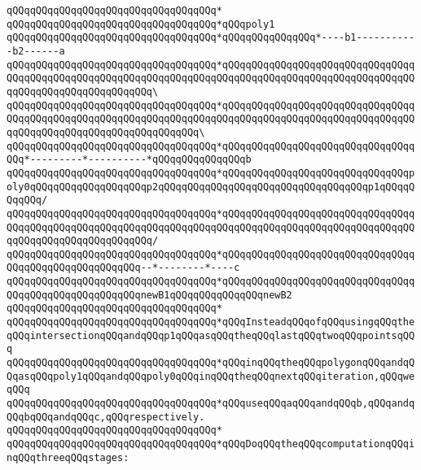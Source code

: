 \verb|qQQqqQQqqQQqqQQqqQQqqQQqqQQqqQQqqQQq*|\newline
\verb|qQQqqQQqqQQqqQQqqQQqqQQqqQQqqQQqqQQq*qQQqpoly1|\newline
\verb|qQQqqQQqqQQqqQQqqQQqqQQqqQQqqQQqqQQq*qQQqqQQqqQQqqQQq*----b1-----------b2------a|\newline
\verb|qQQqqQQqqQQqqQQqqQQqqQQqqQQqqQQqqQQq*qQQqqQQqqQQqqQQqqQQqqQQqqQQqqQQqqQQqqQQqqQQqqQQqqQQqqQQqqQQqqQQqqQQqqQQqqQQqqQQqqQQqqQQqqQQqqQQqqQQqqQQqqQQqqQQqqQQqqQQqqQQqqQQq\|\newline
\verb|qQQqqQQqqQQqqQQqqQQqqQQqqQQqqQQqqQQq*qQQqqQQqqQQqqQQqqQQqqQQqqQQqqQQqqQQqqQQqqQQqqQQqqQQqqQQqqQQqqQQqqQQqqQQqqQQqqQQqqQQqqQQqqQQqqQQqqQQqqQQqqQQqqQQqqQQqqQQqqQQqqQQqqQQqqQQq\|\newline
\verb|qQQqqQQqqQQqqQQqqQQqqQQqqQQqqQQqqQQq*qQQqqQQqqQQqqQQqqQQqqQQqqQQqqQQqqQQq*---------*----------*qQQqqQQqqQQqqQQqb|\newline
\verb|qQQqqQQqqQQqqQQqqQQqqQQqqQQqqQQqqQQq*qQQqqQQqqQQqqQQqqQQqqQQqqQQqqQQqpoly0qQQqqQQqqQQqqQQqqQQqp2qQQqqQQqqQQqqQQqqQQqqQQqqQQqqQQqqQQqp1qQQqqQQqqQQq/|\newline
\verb|qQQqqQQqqQQqqQQqqQQqqQQqqQQqqQQqqQQq*qQQqqQQqqQQqqQQqqQQqqQQqqQQqqQQqqQQqqQQqqQQqqQQqqQQqqQQqqQQqqQQqqQQqqQQqqQQqqQQqqQQqqQQqqQQqqQQqqQQqqQQqqQQqqQQqqQQqqQQqqQQqqQQq/|\newline
\verb|qQQqqQQqqQQqqQQqqQQqqQQqqQQqqQQqqQQq*qQQqqQQqqQQqqQQqqQQqqQQqqQQqqQQqqQQqqQQqqQQqqQQqqQQqqQQq--*--------*----c|\newline
\verb|qQQqqQQqqQQqqQQqqQQqqQQqqQQqqQQqqQQq*qQQqqQQqqQQqqQQqqQQqqQQqqQQqqQQqqQQqqQQqqQQqqQQqqQQqqQQqnewB1qQQqqQQqqQQqqQQqnewB2|\newline
\verb|qQQqqQQqqQQqqQQqqQQqqQQqqQQqqQQqqQQq*|\newline
\verb|qQQqqQQqqQQqqQQqqQQqqQQqqQQqqQQqqQQq*qQQqInsteadqQQqofqQQqusingqQQqtheqQQqintersectionqQQqandqQQqp1qQQqasqQQqtheqQQqlastqQQqtwoqQQqpointsqQQq|\newline
\verb|qQQqqQQqqQQqqQQqqQQqqQQqqQQqqQQqqQQq*qQQqinqQQqtheqQQqpolygonqQQqandqQQqasqQQqpoly1qQQqandqQQqpoly0qQQqinqQQqtheqQQqnextqQQqiteration,qQQqweqQQq|\newline
\verb|qQQqqQQqqQQqqQQqqQQqqQQqqQQqqQQqqQQq*qQQquseqQQqaqQQqandqQQqb,qQQqandqQQqbqQQqandqQQqc,qQQqrespectively.|\newline
\verb|qQQqqQQqqQQqqQQqqQQqqQQqqQQqqQQqqQQq*|\newline
\verb|qQQqqQQqqQQqqQQqqQQqqQQqqQQqqQQqqQQq*qQQqDoqQQqtheqQQqcomputationqQQqinqQQqthreeqQQqstages:|\newline
